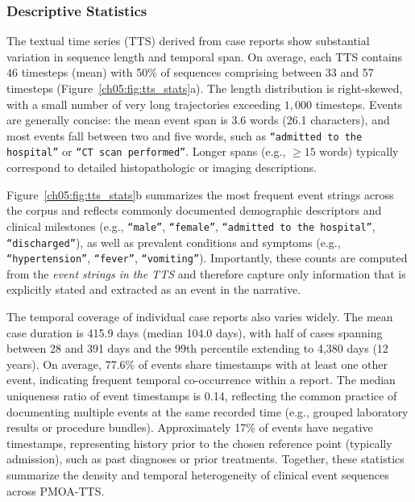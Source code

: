 \subsubsection{Descriptive Statistics}
\label{ch05:sec:descriptive-statistics}

The textual time series (TTS) derived from case reports show substantial variation in sequence length and temporal span. 
On average, each TTS contains $46$ timesteps (mean) %
with 50\% of sequences comprising between 33 and 57 timesteps (Figure~\ref{ch05:fig:tts_stats}a). 
The length distribution is right-skewed, with a small number of very long trajectories exceeding $1{,}000$ timesteps. 
Events are generally concise: the mean event span is 3.6 words (26.1 characters), and most events fall between two and five words, such as \texttt{“admitted to the hospital”} or \texttt{“CT scan performed”}. 
Longer spans (e.g., $\geq 15$ words) typically correspond to detailed histopathologic or imaging descriptions.

Figure~\ref{ch05:fig:tts_stats}b summarizes the most frequent event strings across the corpus and reflects commonly documented demographic descriptors and clinical milestones (e.g., \texttt{``male''}, \texttt{``female''}, \texttt{``admitted to the hospital''}, \texttt{``discharged''}), as well as prevalent conditions and symptoms (e.g., \texttt{``hypertension''}, \texttt{``fever''}, \texttt{``vomiting''}). 
Importantly, these counts are computed from the \emph{event strings in the TTS} and therefore capture only information that is explicitly stated and extracted as an event in the narrative. 


The temporal coverage of individual case reports also varies widely. 
The mean case duration is 415.9 days (median 104.0 days), with half of cases spanning between 28 and 391 days and the 99th percentile extending to 4{,}380 days (12 years). 
On average, 77.6\% of events share timestamps with at least one other event, indicating frequent temporal co-occurrence within a report. 
The median uniqueness ratio of event timestamps is 0.14, reflecting the common practice of documenting multiple events at the same recorded time (e.g., grouped laboratory results or procedure bundles). 
Approximately 17\% of events have negative timestamps, representing history prior to the chosen reference point (typically admission), such as past diagnoses or prior treatments.
Together, these statistics summarize the density and temporal heterogeneity of clinical event sequences across PMOA-TTS. 





